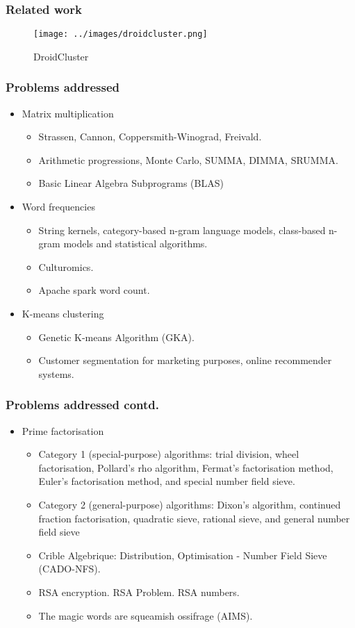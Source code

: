 \documentclass[11pt]{beamer}
\begin{document}
\begin{frame}
\frametitle{Related work}
\begin{figure}[h]
	\centering
	\texttt{[image: ../images/droidcluster.png]}
	\caption{DroidCluster}
	\label{droidcluster}
\end{figure}
\end{frame}

\begin{frame}
\frametitle{Problems addressed}
\begin{itemize}
	\item Matrix multiplication
	\begin{itemize}
		\item Strassen, Cannon, Coppersmith-Winograd, Freivald.
		\item Arithmetic progressions, Monte Carlo, SUMMA, DIMMA, SRUMMA.
		\item Basic Linear Algebra Subprograms (BLAS)
	\end{itemize}
	\item Word frequencies
	\begin{itemize}
		\item String kernels, category-based n-gram language models, class-based n-gram models and statistical algorithms.
		\item Culturomics.
		\item Apache spark word count.
	\end{itemize}
	\item K-means clustering
	\begin{itemize}
		\item Genetic K-means Algorithm (GKA).
		\item Customer segmentation for marketing purposes, online recommender systems.
	\end{itemize}
\end{itemize}
\end{frame}

\begin{frame}
\frametitle{Problems addressed contd.}
\begin{itemize}
	\item Prime factorisation
	\begin{itemize}
		\item Category 1 (special-purpose) algorithms: trial division, wheel factorisation, Pollard’s rho algorithm, Fermat’s factorisation method, Euler’s factorisation method, and special number field sieve.
		\item Category 2 (general-purpose) algorithms: Dixon’s algorithm, continued fraction factorisation, quadratic sieve, rational sieve, and general number field sieve
		\item Crible Algebrique: Distribution, Optimisation - Number Field Sieve  (CADO-NFS).
		\item RSA encryption. RSA Problem. RSA numbers.
		\item The magic words are squeamish ossifrage (AIMS).
	\end{itemize}
\end{itemize}
\end{frame}
\end{document}
